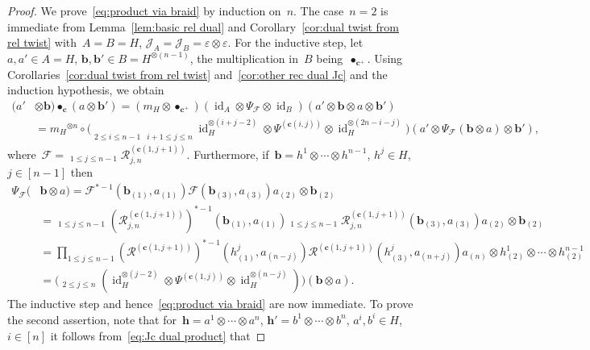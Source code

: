 \documentclass[12pt, reqno]{amsart}
\theoremstyle{definition}
\newcommand{\ascprod}{\mathop{\overrightarrow{\prod}}}
\newcommand{\dscprod}{\mathop{\overleftarrow{\prod}}}
\newcommand{\ascprodst}{\mathop{\overrightarrow{\prod}^\ast}}
\newcommand{\dscprodst}{\mathop{\overleftarrow{\prod}^\ast}}
\numberwithin{equation}{section}
\newcommand{\tensor}{\otimes}
\DeclareMathOperator{\id}{id}
\begin{document}
\begin{proof}
We prove~\eqref{eq:product via braid} by induction on~$n$. The case~$n=2$ is
immediate from Lemma~\ref{lem:basic rel dual} and Corollary~\ref{cor:dual twist from rel twist} with~$A=B=H$, $\mathcal J_A=\mathcal J_B=\varepsilon\tensor\varepsilon$. 
For the inductive step, let
$a,a'\in A=H$, $\mathbf b,\mathbf b'\in B=H^{\tensor (n-1)}$, the multiplication in~$B$ being~$\bullet_{\mathbf c^+}$. 
Using Corollaries~\ref{cor:dual twist from rel twist} and~\ref{cor:other rec dual Jc} and the
induction hypothesis, we obtain
\begin{align*}
(a'&\tensor \mathbf b)\bullet_{\mathbf c}(a\tensor \mathbf  b')
=(m_H\tensor \bullet_{\mathbf c^+})(\id_A\tensor \Psi_{\mathcal F}
\tensor \id_B)( a'\tensor\mathbf b\tensor a\tensor\mathbf  b')\\
&=
m_H{}^{\tensor n}\circ
\Big(\dscprod\limits_{2\le i\le n-1}
\ascprod\limits_{i+1\le j\le n}
\id_H^{\tensor(i+j-2)}\tensor \Psi^{(\mathbf c(i,j))}\tensor\id_H^{\tensor (2n-i-j)}\Big)
(a'\tensor \Psi_{\mathcal F}(\mathbf b\tensor  a)
\tensor \mathbf b'),
\end{align*}
where~$\mathcal F=\ascprodst_{1\le j\le n-1} \mathcal R_{j,n}^{(\mathbf c(1,j+1))}$. Furthermore,
if~$\mathbf b=h^1\tensor\cdots \tensor h^{n-1}$,
$h^j\in H$, $j\in[n-1]$ then
\begin{align}
\Psi_{\mathcal F}(&\mathbf b\tensor a)
=\mathcal F^{\ast-1}(\mathbf b_{(1)}, a_{(1)})
\mathcal F(\mathbf b_{(3)},a_{(3)})
a_{(2)} \tensor \mathbf b_{(2)} \nonumber\\
&=\dscprodst_{1\le j\le n-1} (\mathcal R_{j,n}^{(\mathbf c(1,j+1))})^{\ast-1}(\mathbf b_{(1)},a_{(1)})\ascprodst_{1\le j\le n-1} \mathcal R_{j,n}^{(\mathbf c(1,j+1))}(\mathbf b_{(3)},a_{(3)}) a_{(2)}\tensor \mathbf b_{(2)}\nonumber\\
&=
\prod_{1\le j\le n-1} (\mathcal R^{(\mathbf c(1,j+1))})^{\ast-1}(h^{j}_{(1)},a_{(n-j)})
\mathcal R^{(\mathbf c(1,j+1))}(h^{j}_{(3)},a_{(n+j)}) a_{(n)}\tensor h^1_{(2)}
\tensor\cdots\tensor h^{n-1}_{(2)}\nonumber\\
&=\Big(\ascprod_{2\le j\le n} (\id_H^{\tensor (j-2)}
\tensor \Psi^{(\mathbf c(1,j))}\tensor \id_H^{\tensor (n-j)})\Big)(\mathbf b\tensor a).\label{eq:id Psi b a}
\end{align}
The inductive step and hence~\eqref{eq:product via braid} are now immediate. To prove the second assertion,
note that for~$\mathbf h=a^1\tensor\cdots\tensor a^n$,
$\mathbf h'=b^1\tensor\cdots\tensor b^n$, $a^i,b^i\in H$,
$i\in [n]$ it follows from~\eqref{eq:Jc dual product} that  

\end{proof}
\end{document}
